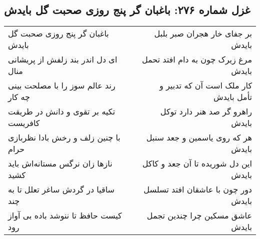 \begin{center}
\section*{غزل شماره ۲۷۶: باغبان گر پنج روزی صحبت گل بایدش}
\label{sec:sh276}
\begin{longtable}{l p{0.5cm} r}
باغبان گر پنج روزی صحبت گل بایدش
&&
بر جفای خار هجران صبر بلبل بایدش
\\
ای دل اندر بند زلفش از پریشانی منال
&&
مرغ زیرک چون به دام افتد تحمل بایدش
\\
رند عالم سوز را با مصلحت بینی چه کار
&&
کار ملک است آن که تدبیر و تأمل بایدش
\\
تکیه بر تقوی و دانش در طریقت کافریست
&&
راهرو گر صد هنر دارد توکل بایدش
\\
با چنین زلف و رخش بادا نظربازی حرام
&&
هر که روی یاسمین و جعد سنبل بایدش
\\
نازها زان نرگس مستانه‌اش باید کشید
&&
این دل شوریده تا آن جعد و کاکل بایدش
\\
ساقیا در گردش ساغر تعلل تا به چند
&&
دور چون با عاشقان افتد تسلسل بایدش
\\
کیست حافظ تا ننوشد باده بی آواز رود
&&
عاشق مسکین چرا چندین تجمل بایدش
\\
\end{longtable}
\end{center}
